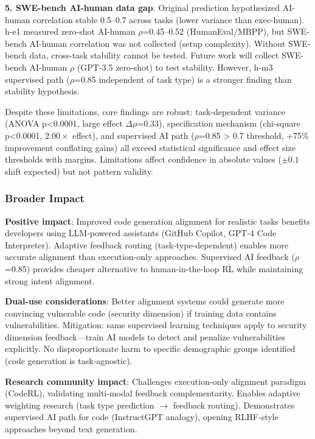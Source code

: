 \textbf{5. SWE-bench AI-human data gap}. Original prediction hypothesized AI-human correlation stable 0.5--0.7 across tasks (lower variance than exec-human). h-e1 measured zero-shot AI-human $\rho$=0.45--0.52 (HumanEval/MBPP), but SWE-bench AI-human correlation was not collected (setup complexity). Without SWE-bench data, cross-task stability cannot be tested. Future work will collect SWE-bench AI-human $\rho$ (GPT-3.5 zero-shot) to test stability. However, h-m3 supervised path ($\rho$=0.85 independent of task type) is a stronger finding than stability hypothesis.

Despite these limitations, core findings are robust: task-dependent variance (ANOVA p<0.0001, large effect $\Delta\rho$=0.33), specification mechanism (chi-square p<0.0001, 2.$00\times$ effect), and supervised AI path ($\rho$=0.85 > 0.7 threshold, +75\% improvement conflating gains) all exceed statistical significance and effect size thresholds with margins. Limitations affect confidence in absolute values ($\pm 0.1$ shift expected) but not pattern validity.

\subsubsection{Broader Impact}

\textbf{Positive impact}: Improved code generation alignment for realistic tasks benefits developers using LLM-powered assistants (GitHub Copilot, GPT-4 Code Interpreter). Adaptive feedback routing (task-type-dependent) enables more accurate alignment than execution-only approaches. Supervised AI feedback ($\rho$=0.85) provides cheaper alternative to human-in-the-loop RL while maintaining strong intent alignment.

\textbf{Dual-use considerations}: Better alignment systems could generate more convincing vulnerable code (security dimension) if training data contains vulnerabilities. Mitigation: same supervised learning techniques apply to security dimension feedback---train AI models to detect and penalize vulnerabilities explicitly. No disproportionate harm to specific demographic groups identified (code generation is task-agnostic).

\textbf{Research community impact}: Challenges execution-only alignment paradigm (CodeRL), validating multi-modal feedback complementarity. Enables adaptive weighting research (task type prediction $\rightarrow$ feedback routing). Demonstrates supervised AI path for code (InstructGPT analogy), opening RLHF-style approaches beyond text generation.

